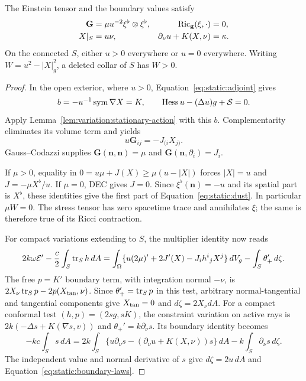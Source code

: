 \begin{lemma}\label{lem:static:stress-boundary}
The Einstein tensor and the boundary values satisfy
\begin{align}\label{eq:static:dust}
 \mathbf G&=\mu u^{-2}\xi^\flat\otimes\xi^\flat,
 &\operatorname{Ric}_{\mathbf g}(\xi,\cdot)&=0,\\
 \label{eq:static:boundary-laws}
 X|_S&=u\nu,&\partial_\nu u+K(X,\nu)&=\kappa.
\end{align}
On the connected $S$, either $u>0$ everywhere or $u=0$ everywhere.
Writing $W=u^2-|X|_g^2$, a deleted collar of $S$ has $W>0$.
\end{lemma}

\begin{proof}
In the open exterior, where $u>0$, Equation~\eqref{eq:static:adjoint}
gives
\[
 b=-u^{-1}\operatorname{sym}\nabla X=K,\qquad
 \operatorname{Hess} u-(\Delta u)g+\mathcal S=0.
\]
Apply Lemma~\ref{lem:variation:stationary-action} with this $b$.
Complementarity eliminates its volume term and yields
\[
 u\mathbf G_{ij}=-J_{(i}X_{j)}.
\]
Gauss--Codazzi supplies $\mathbf G(\mathbf n,\mathbf n)=\mu$ and
$\mathbf G(\mathbf n,\partial_i)=J_i$.

If $\mu>0$, equality in
$0=u\mu+J(X)\geq\mu(u-|X|)$ forces
$|X|=u$ and $J=-\mu X^\flat/u$.  If $\mu=0$, DEC gives $J=0$.
Since $\xi^\flat(\mathbf n)=-u$ and its spatial part is
$X^\flat$, these identities give the first part of
Equation~\eqref{eq:static:dust}.  In particular $\mu W=0$.
The stress tensor has zero spacetime trace and annihilates $\xi$;
the same is therefore true of its Ricci contraction.

For compact variations extending to $S$, the multiplier identity
now reads
\[
 2k\omega\mathcal E'-\frac c2\int_S\operatorname{tr}_S h\,dA
 =\int_\Omega\{u(2\mu)'+2J'(X)-J_i h^i{}_jX^j\}\,dV_g
 -\int_S\theta_+'\,d\zeta.
\]
The free $p=K'$ boundary term, with integration normal $-\nu$, is
$2X_\nu\operatorname{tr}_S p-2p(X_{\rm tan},\nu)$.
Since $\theta_+'=\operatorname{tr}_S p$ in this test, arbitrary normal-tangential
and tangential components give
$X_{\rm tan}=0$ and $d\zeta=2X_\nu dA$.
For a compact conformal test $(h,p)=(2s g,sK)$, the constraint
variation on active rays is
$2k(-\Delta s+K(\nabla s,v))$ and
$\theta_+'=k\partial_\nu s$.  Its boundary identity becomes
\[
 -kc\int_Ss\,dA
 =2k\int_S\{u\partial_\nu s-
       (\partial_\nu u+K(X,\nu))s\}\,dA
       -k\int_S\partial_\nu s\,d\zeta.
\]
The independent value and normal derivative of $s$ give
$d\zeta=2u\,dA$ and Equation~\eqref{eq:static:boundary-laws}.


\end{proof}
